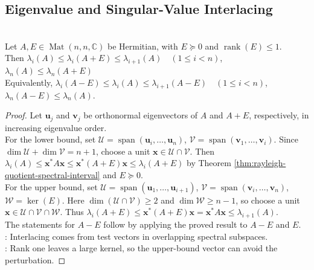 \subsection{Eigenvalue and Singular-Value Interlacing}

\begin{theorem} \label{thm:rank-one-psd-eigenvalue-interlacing} \\
Let $A,E\in\operatorname{Mat}(n,n,\mathbb{C})$ be Hermitian, with $E\succeq0$ and $\operatorname{rank}(E)\leq1$.\\
Then $\lambda_i(A)\leq\lambda_i(A+E)\leq\lambda_{i+1}(A)\quad(1\leq i<n)$, $\lambda_n(A)\leq\lambda_n(A+E)$\\
Equivalently, $\lambda_i(A-E)\leq\lambda_i(A)\leq\lambda_{i+1}(A-E)\quad(1\leq i<n)$, $\lambda_n(A-E)\leq\lambda_n(A)$.
\begin{proof}
Let $\mathbf{u}_j$ and $\mathbf{v}_j$ be orthonormal eigenvectors of $A$ and $A+E$, respectively, in increasing eigenvalue order.\\
For the lower bound, set $\mathcal{U}=\operatorname{span}(\mathbf{u}_i,\ldots,\mathbf{u}_n)$, $\mathcal{V}=\operatorname{span}(\mathbf{v}_1,\ldots,\mathbf{v}_i)$. Since $\dim\mathcal{U}+\dim\mathcal{V}=n+1$, choose a unit $\mathbf{x}\in\mathcal{U}\cap\mathcal{V}$. Then $\lambda_i(A)\leq \mathbf{x}^*A\mathbf{x}\leq \mathbf{x}^*(A+E)\mathbf{x}\leq\lambda_i(A+E)$ by Theorem \ref{thm:rayleigh-quotient-spectral-interval} and $E\succeq0$.\\
For the upper bound, set $\mathcal{U}=\operatorname{span}(\mathbf{u}_1,\ldots,\mathbf{u}_{i+1})$, $\mathcal{V}=\operatorname{span}(\mathbf{v}_i,\ldots,\mathbf{v}_n)$, $\mathcal{W}=\ker(E)$. Here $\dim(\mathcal{U}\cap\mathcal{V})\geq2$ and $\dim\mathcal{W}\geq n-1$, so choose a unit $\mathbf{x}\in\mathcal{U}\cap\mathcal{V}\cap\mathcal{W}$. Thus $\lambda_i(A+E)\leq \mathbf{x}^*(A+E)\mathbf{x} =\mathbf{x}^*A\mathbf{x} \leq \lambda_{i+1}(A)$.\\
The statements for $A-E$ follow by applying the proved result to $A-E$ and $E$.\\
: Interlacing comes from test vectors in overlapping spectral subspaces.\\
: Rank one leaves a large kernel, so the upper-bound vector can avoid the perturbation.
\end{proof}
\end{theorem}

